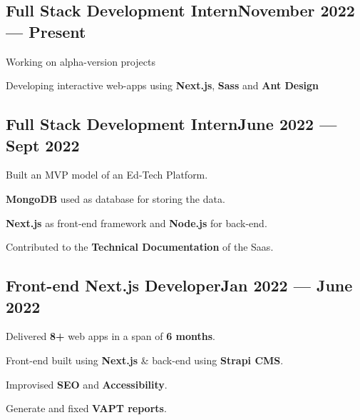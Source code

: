 \subsection{{Full Stack Development Intern\hfill November 2022 --- Present}}
\begin{zitemize}
\item Working on alpha-version projects
\item Developing interactive web-apps using \textbf{Next.js}, \textbf{Sass} and \textbf{Ant Design}
\end{zitemize}

\subsection{{Full Stack Development Intern\hfill June 2022 --- Sept 2022}}
\begin{zitemize}
\item Built an MVP model of an Ed-Tech Platform.
\item \textbf{MongoDB} used as database for storing the data.
\item \textbf{Next.js} as front-end framework and \textbf{Node.js} for back-end.
\item Contributed to the \textbf{Technical Documentation} of the Saas.
\end{zitemize}

\subsection{{Front-end Next.js Developer\hfill Jan 2022 --- June 2022}}
\begin{zitemize}
\item Delivered \textbf{8+} web apps in a span of \textbf{6 months}.
\item Front-end built using \textbf{Next.js} \& back-end using \textbf{Strapi CMS}.
\item Improvised \textbf{SEO} and \textbf{Accessibility}.
\item Generate and fixed \textbf{VAPT reports}.
\end{zitemize}

